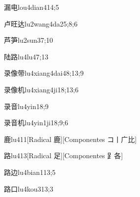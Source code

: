 \begin{verbete}{漏电}{lou4dian4}{14;5}
\end{verbete}

\begin{verbete}{卢旺达}{lu2wang4da2}{5;8;6}
\end{verbete}

\begin{verbete}{芦笋}{lu2sun3}{7;10}
\end{verbete}

\begin{verbete}{陆路}{lu4lu4}{7;13}
\end{verbete}

\begin{verbete}{录像带}{lu4xiang4dai4}{8;13;9}
\end{verbete}

\begin{verbete}{录像机}{lu4xiang4ji1}{8;13;6}
\end{verbete}

\begin{verbete}{录音}{lu4yin1}{8;9}
\end{verbete}

\begin{verbete}{录音机}{lu4yin1ji1}{8;9;6}
\end{verbete}

\begin{verbete}{鹿}{lu4}{11}[Radical 鹿][Componentes コ丨广比]
\end{verbete}

\begin{verbete}{路}{lu4}{13}[Radical 足][Componentes ⻊各]
\end{verbete}

\begin{verbete}{路边}{lu4bian1}{13;5}
\end{verbete}

\begin{verbete}{路口}{lu4kou3}{13;3}
\end{verbete}

